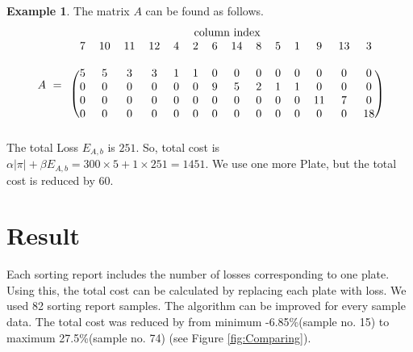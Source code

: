 \documentclass[a4paper]{amsart}
\numberwithin{equation}{section} %
\numberwithin{figure}{section} %
\numberwithin{table}{section}
\theoremstyle{plain}
\theoremstyle{definition}
\newtheorem{example}[thm]{Example}
\theoremstyle{plain}
\theoremstyle{plain}
\theoremstyle{plain}
\theoremstyle{plain}
\theoremstyle{plain}
\begin{document}
\begin{example}
\noindent	
The matrix $A$ can be found as follows.
\begin{equation*}
\begin{array}{rc}
&\text{column index}\\
A\,\,=&
\begin{blockarray}{cccccccccccccc}
7 & 10 & 11 & 12 & 4 & 2 & 6 & 14 & 8 & 5 & 1 & 9 & 13 & 3\\
&&&&&&&&&&&&&\\
\begin{block}{(cccccccccccccc)}
5 & 5 & 3 & 3 & 1 & 1 & 0 & 0 & 0 & 0 & 0 & 0 & 0 & 0 \\
0 & 0 & 0 & 0 & 0 & 0 & 9 & 5 & 2 & 1 & 1 & 0 & 0 & 0 \\
0 & 0 & 0 & 0 & 0 & 0 & 0 & 0 & 0 & 0 & 0 & 11& 7 & 0 \\
0 & 0 & 0 & 0 & 0 & 0 & 0 & 0 & 0 & 0 & 0 & 0 & 0 & 18\\
\end{block}
\end{blockarray}
\end{array}
\end{equation*}
\noindent
The total Loss $E_{A,b}$ is $251$. So, total cost is $\alpha|\pi|+\beta E_{A,b}=300 \times 5+1 \times 251 =1451$. We use one more Plate, but the total cost is reduced by $60$.
	

	
\end{example}



\section{Result}\label{sec:Result}

Each sorting report includes the number of losses corresponding to one plate. 
Using this, the total cost can be calculated by replacing each plate with loss. 
We used 82 sorting report samples. The algorithm can be improved for every sample data.
The total cost was reduced by from minimum -6.85\%(sample no. 15) to maximum 27.5\%(sample no. 74) (see Figure \ref{fig:Comparing}).
\end{document}
